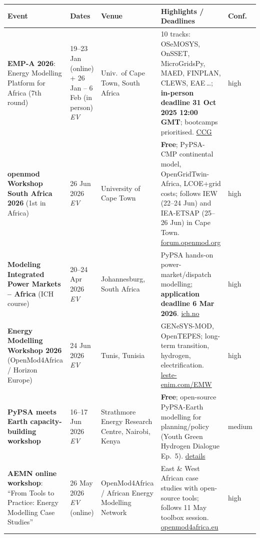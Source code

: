 \documentclass[11pt,a4paper]{article}
\newcommand{\ev}{\emph{EV}}
\begin{document}
\begin{longtable}{@{}p{3.2cm}p{3.0cm}p{2.5cm}p{5.2cm}p{1.6cm}@{}}
\toprule
\textbf{Event} & \textbf{Dates} & \textbf{Venue} & \textbf{Highlights / Deadlines} & \textbf{Conf.} \\
\midrule
\endhead
\textbf{EMP-A 2026}: Energy Modelling Platform for Africa (7th round)
  & 19--23 Jan (online) + 26 Jan -- 6 Feb (in person) \ev{}
  & Univ.\ of Cape Town, South Africa
  & 10 tracks: OSeMOSYS, OnSSET, MicroGridsPy, MAED, FINPLAN, CLEWS, EAE\,\ldots; \textbf{in-person deadline 31 Oct 2025 12:00 GMT}; bootcamps prioritised. \href{https://climatecompatiblegrowth.com/energy-modelling-platform-for-africa-emp-a-2026/}{CCG}
  & high \\
\midrule
\textbf{openmod Workshop South Africa 2026} (1st in Africa)
  & 26 Jun 2026 \ev{}
  & University of Cape Town
  & \textbf{Free}; PyPSA-CMP continental model, OpenGridTwin-Africa, LCOE+grid costs; follows IEW (22--24 Jun) and IEA-ETSAP (25--26 Jun) in Cape Town. \href{https://forum.openmod.org/t/openmod-workshop-south-africa-2026/5619}{forum.openmod.org}
  & high \\
\midrule
\textbf{Modeling Integrated Power Markets -- Africa} (ICH course)
  & 20--24 Apr 2026 \ev{}
  & Johannesburg, South Africa
  & PyPSA hands-on power-market/dispatch modelling; \textbf{application deadline 6 Mar 2026}. \href{https://ich.no/modeling-integrated-power-markets-africa/}{ich.no}
  & high \\
\midrule
\textbf{Energy Modelling Workshop 2026} (OpenMod4Africa / Horizon Europe)
  & 24 Jun 2026 \ev{}
  & Tunis, Tunisia
  & GENeSYS-MOD, OpenTEPES; long-term transition, hydrogen, electrification. \href{https://leste-enim.com/EMW/}{leste-enim.com/EMW}
  & high \\
\midrule
\textbf{PyPSA meets Earth capacity-building workshop}
  & 16--17 Jun 2026 \ev{}
  & Strathmore Energy Research Centre, Nairobi, Kenya
  & \textbf{Free}; open-source PyPSA-Earth modelling for planning/policy (Youth Green Hydrogen Dialogue Ep.\ 5). \href{https://www.linkedin.com/posts/ayigh%2Eafrica_episode05-gentlemen-10slots-activity-7470947404431872000-B2VV}{details}
  & medium \\
\midrule
\textbf{AEMN online workshop}: ``From Tools to Practice: Energy Modelling Case Studies''
  & 26 May 2026 \ev{} (online)
  & OpenMod4Africa / African Energy Modelling Network
  & East \& West African case studies with open-source tools; follows 11 May toolbox session. \href{https://openmod4africa.eu/from-tools-to-practice-energy-modelling-case-studies-aemn-workshop}{openmod4africa.eu}
  & high \\
\bottomrule
\end{longtable}
\end{document}
